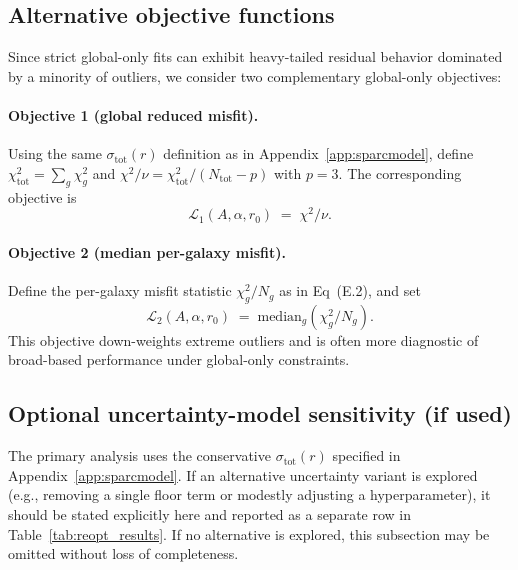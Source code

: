 \documentclass[entropy,article,submit,pdftex,moreauthors]{Definitions/mdpi}
\begin{document}
\subsection{Alternative objective functions}
Since strict global-only fits can exhibit heavy-tailed residual behavior dominated by a minority of outliers, we consider two complementary global-only objectives:

\paragraph{Objective 1 (global reduced misfit).}
Using the same \(\sigma_{\mathrm{tot}}(r)\) definition as in Appendix~\ref{app:sparcmodel}, define
\(\chi^2_{\mathrm{tot}}=\sum_g \chi^2_g\) and \(\chi^2/\nu=\chi^2_{\mathrm{tot}}/(N_{\mathrm{tot}}-p)\)
with \(p=3\). The corresponding objective is
\begin{equation}
\mathcal{L}_1(A,\alpha,r_0) \;=\; \chi^2/\nu.
\tag{E.2}
\end{equation}

\paragraph{Objective 2 (median per-galaxy misfit).}
Define the per-galaxy misfit statistic \(\chi^2_g/N_g\) as in Eq~(E.2), and set
\begin{equation}
\mathcal{L}_2(A,\alpha,r_0) \;=\; \mathrm{median}_g\!\left(\chi^2_g/N_g\right).
\tag{E.3}
\end{equation}
This objective down-weights extreme outliers and is often more diagnostic of broad-based performance under global-only constraints.

\subsection{Optional uncertainty-model sensitivity (if used)}
The primary analysis uses the conservative \(\sigma_{\mathrm{tot}}(r)\) specified in Appendix~\ref{app:sparcmodel}. If an alternative uncertainty variant is explored (e.g., removing a single floor term or modestly adjusting a hyperparameter), it should be stated explicitly here and
reported as a separate row in Table~\ref{tab:reopt_results}. If no alternative is explored, this subsection may be omitted without loss of completeness.
\end{document}
